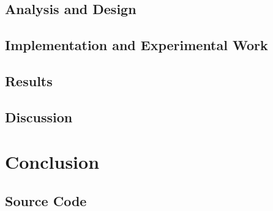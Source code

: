 \documentclass[11pt,a4paper]{report}
\begin{document}
		\section{Analysis and Design}
		\section{Implementation and Experimental Work}
		\section{Results}
		\section{Discussion}
		
	\chapter{Conclusion}
	
	
	
	\nocite{*}
	
	\begin{appendices}
		\chapter{Source Code}
	\end{appendices}
\end{document}
